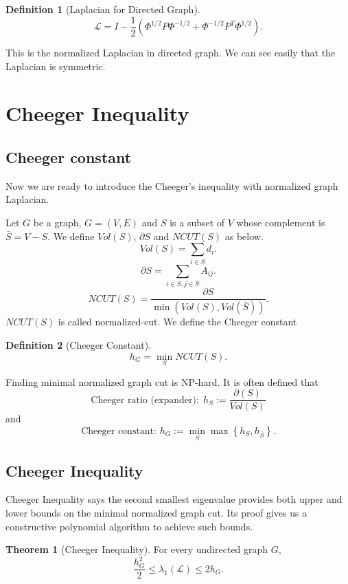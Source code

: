 \documentclass[twoside]{article}
\theoremstyle{definition}
\newtheorem{thm}{Theorem}[section]
\theoremstyle{definition}
\newtheorem*{defn}{Definition}
\theoremstyle{remark}
\def\L{{\mathcal L}}
\begin{document}
   \begin{defn}[Laplacian for Directed Graph]
    \[\L=I-\frac{1}{2}(\Phi^{1/2}P\Phi^{-1/2}+\Phi^{-1/2}P^T\Phi^{1/2}).\]
  \end{defn}

  This is the normalized Laplacian in directed graph.  We can see easily that the Laplacian is symmetric.

\section{Cheeger Inequality}
\subsection{Cheeger constant}
Now we are ready to introduce the Cheeger's inequality with normalized graph Laplacian.

Let $G$ be a graph, $G=(V,E)$ and $S$ is a subset of $V$ whose complement is $\bar{S}=V-S$. We define $Vol(S)$, $\partial S$ and $NCUT(S)$ as below.
\[
Vol(S)=\sum_{i\in S}d_i.
\]
\[
\partial S=\sum_{i\in S, j\in\bar{S}}A_{ij}.
\]
\[
NCUT(S)=\frac{\partial S}{\min (Vol(S),Vol(\bar{S}))}.
\]
$NCUT(S)$ is called normalized-cut. We define the Cheeger constant
\begin{defn}[Cheeger Constant]
    \[ h_{G}=\min_{S}NCUT(S). \]
  \end{defn}

Finding minimal normalized graph cut is NP-hard. It is often defined that
\[ \mbox{Cheeger ratio (expander):}\ \  h_S := \frac{\partial(S)}{Vol(S)} \]
and
\[ \mbox{Cheeger constant:\ \ } h_G := \min_S \max\left\{ h_S, h_{\bar{S}} \right\}. \]

\subsection{Cheeger Inequality}
Cheeger Inequality says the second smallest eigenvalue provides both upper and lower bounds on the minimal normalized graph cut. Its proof gives us a constructive polynomial algorithm to achieve such bounds.
\begin{thm}[Cheeger Inequality]
For every undirected graph $G$,
\[
\frac{h_{G}^2}{2}\le \lambda_1(\L)\le 2h_G.
\]
\end{thm}
\end{document}
